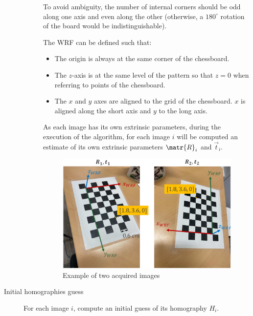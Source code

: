 \begin{description}
\begin{description}
                \begin{remark}
                    To avoid ambiguity, the number of internal corners should be odd along one axis and even along the other
                    (otherwise, a $180^\circ$ rotation of the board would be indistinguishable).
                \end{remark}

                The WRF can be defined such that:
                \begin{itemize}
                    \item The origin is always at the same corner of the chessboard.
                    \item The $z$-axis is at the same level of the pattern so that $z=0$ when referring to points of the chessboard.
                    \item The $x$ and $y$ axes are aligned to the grid of the chessboard. $x$ is aligned along the short axis and $y$ to the long axis.
                \end{itemize}

                \begin{remark}
                    As each image has its own extrinsic parameters,
                    during the execution of the algorithm, for each image $i$ will be computed
                    an estimate of its own extrinsic parameters $\matr{R}_i$ and $\vec{t}_i$.
                \end{remark}

                \begin{figure}[H]
                    \centering
                    \includegraphics[width=0.45\linewidth]{./img/_zhang_image_acquistion.pdf}
                    \caption{Example of two acquired images}
                \end{figure}
        \end{description}

    \item[Initial homographies guess]
        For each image $i$, compute an initial guess of its homography $H_i$.


\end{description}
